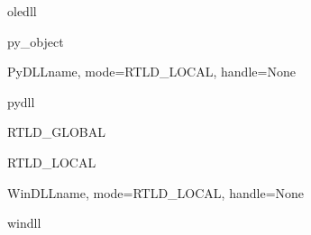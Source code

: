 \begin{datadesc}{oledll}
\end{datadesc}

\begin{classdesc}{py_object}{}
\end{classdesc}

\begin{classdesc}{PyDLL}{name, mode=RTLD_LOCAL, handle=None}
\end{classdesc}

\begin{datadesc}{pydll}{}
\end{datadesc}

\begin{datadesc}{RTLD_GLOBAL}
\end{datadesc}

\begin{datadesc}{RTLD_LOCAL}
\end{datadesc}

\begin{classdesc}{WinDLL}{name, mode=RTLD_LOCAL, handle=None}
\end{classdesc}

\begin{datadesc}{windll}
\end{datadesc}

